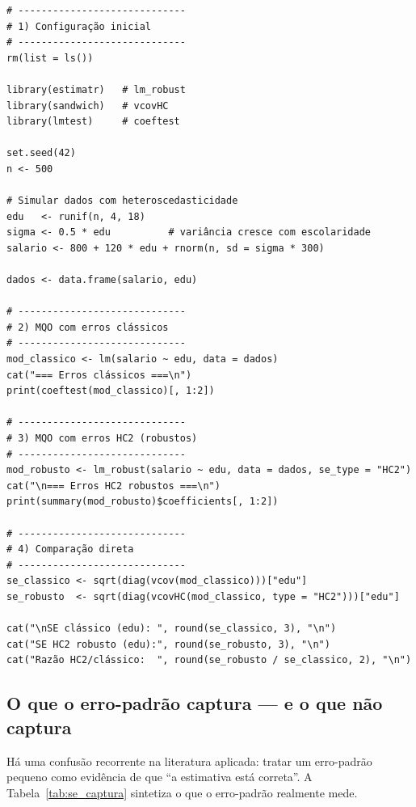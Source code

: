 \begin{lstlisting}[style=Rstyle, caption={Erros-padrão clássicos vs.\ robustos em R}]
# -----------------------------
# 1) Configuração inicial
# -----------------------------
rm(list = ls())

library(estimatr)   # lm_robust
library(sandwich)   # vcovHC
library(lmtest)     # coeftest

set.seed(42)
n <- 500

# Simular dados com heteroscedasticidade
edu   <- runif(n, 4, 18)
sigma <- 0.5 * edu          # variância cresce com escolaridade
salario <- 800 + 120 * edu + rnorm(n, sd = sigma * 300)

dados <- data.frame(salario, edu)

# -----------------------------
# 2) MQO com erros clássicos
# -----------------------------
mod_classico <- lm(salario ~ edu, data = dados)
cat("=== Erros clássicos ===\n")
print(coeftest(mod_classico)[, 1:2])

# -----------------------------
# 3) MQO com erros HC2 (robustos)
# -----------------------------
mod_robusto <- lm_robust(salario ~ edu, data = dados, se_type = "HC2")
cat("\n=== Erros HC2 robustos ===\n")
print(summary(mod_robusto)$coefficients[, 1:2])

# -----------------------------
# 4) Comparação direta
# -----------------------------
se_classico <- sqrt(diag(vcov(mod_classico)))["edu"]
se_robusto  <- sqrt(diag(vcovHC(mod_classico, type = "HC2")))["edu"]

cat("\nSE clássico (edu): ", round(se_classico, 3), "\n")
cat("SE HC2 robusto (edu):", round(se_robusto, 3), "\n")
cat("Razão HC2/clássico:  ", round(se_robusto / se_classico, 2), "\n")
\end{lstlisting}

\subsection*{O que o erro-padrão captura — e o que não captura}

Há uma confusão recorrente na literatura aplicada: tratar um erro-padrão pequeno como evidência de que ``a estimativa está correta''. A Tabela~\ref{tab:se_captura} sintetiza o que o erro-padrão realmente mede.

